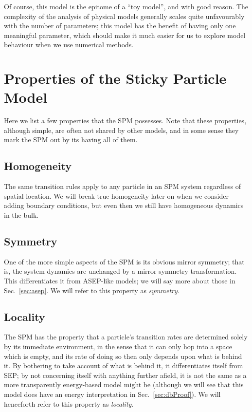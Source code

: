 Of course, this model is the epitome of a ``toy model'', and with good reason. The complexity of the
analysis of physical models generally scales quite unfavourably with the number of parameters; this model
has the benefit of having only one meaningful parameter, which should make it much easier for us
to explore model behaviour when we use numerical methods.

\section{Properties of the Sticky Particle Model} \label{sec:spmProperties}
Here we list a few properties that the SPM possesses. Note that these properties, although simple, are
often not shared by other models, and in some sense they mark the SPM out by its having all of them.
\subsection{Homogeneity}
The same transition rules apply to any particle in an SPM system regardless of spatial location.
We will break true homogeneity later on when we consider adding boundary conditions, but even then
we still have homogeneous dynamics in the bulk.
\subsection{Symmetry}
One of the more simple aspects of the SPM is its obvious mirror symmetry; that is, the system dynamics
are unchanged by a mirror symmetry transformation. This differentiates it from ASEP-like models; we
will say more about those in Sec.~\ref{sec:asep}. We will refer to this property as \textit{symmetry}.
\subsection{Locality}
The SPM has the property that a particle's transition rates are determined solely by its immediate
environment, in the sense that it can only hop into a space which is empty, and its rate of doing so
then only depends upon what is behind it. By bothering to take account of what is behind it, it 
differentiates itself from SEP; by not concerning itself with anything further afield, it is not the
same as a more transparently energy-based model might be (although we will see that this model does
have an energy interpretation in Sec.~\ref{sec:dbProof}). We will henceforth refer to this property
as \textit{locality}.
